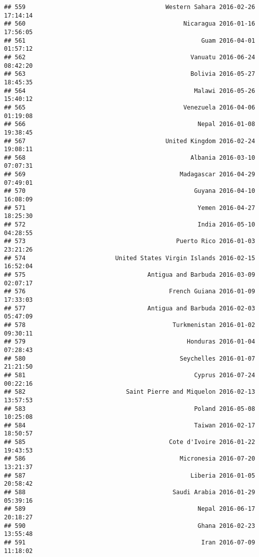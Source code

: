 \documentclass[
]{article}
\begin{document}
\begin{verbatim}
## 559                                       Western Sahara 2016-02-26 17:14:14
## 560                                            Nicaragua 2016-01-16 17:56:05
## 561                                                 Guam 2016-04-01 01:57:12
## 562                                              Vanuatu 2016-06-24 08:42:20
## 563                                              Bolivia 2016-05-27 18:45:35
## 564                                               Malawi 2016-05-26 15:40:12
## 565                                            Venezuela 2016-04-06 01:19:08
## 566                                                Nepal 2016-01-08 19:38:45
## 567                                       United Kingdom 2016-02-24 19:08:11
## 568                                              Albania 2016-03-10 07:07:31
## 569                                           Madagascar 2016-04-29 07:49:01
## 570                                               Guyana 2016-04-10 16:08:09
## 571                                                Yemen 2016-04-27 18:25:30
## 572                                                India 2016-05-10 04:28:55
## 573                                          Puerto Rico 2016-01-03 23:21:26
## 574                         United States Virgin Islands 2016-02-15 16:52:04
## 575                                  Antigua and Barbuda 2016-03-09 02:07:17
## 576                                        French Guiana 2016-01-09 17:33:03
## 577                                  Antigua and Barbuda 2016-02-03 05:47:09
## 578                                         Turkmenistan 2016-01-02 09:30:11
## 579                                             Honduras 2016-01-04 07:28:43
## 580                                           Seychelles 2016-01-07 21:21:50
## 581                                               Cyprus 2016-07-24 00:22:16
## 582                            Saint Pierre and Miquelon 2016-02-13 13:57:53
## 583                                               Poland 2016-05-08 10:25:08
## 584                                               Taiwan 2016-02-17 18:50:57
## 585                                        Cote d'Ivoire 2016-01-22 19:43:53
## 586                                           Micronesia 2016-07-20 13:21:37
## 587                                              Liberia 2016-01-05 20:58:42
## 588                                         Saudi Arabia 2016-01-29 05:39:16
## 589                                                Nepal 2016-06-17 20:18:27
## 590                                                Ghana 2016-02-23 13:55:48
## 591                                                 Iran 2016-07-09 11:18:02

\end{verbatim}
\end{document}
